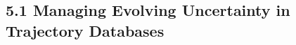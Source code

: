 \documentclass{beamer}
\begin{document}
\subsection{5.1 Managing Evolving Uncertainty in Trajectory Databases}

% 
% 



\end{document}
